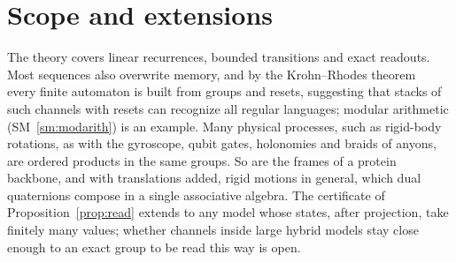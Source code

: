 \documentclass[aps,prx,reprint,superscriptaddress,longbibliography,nofootinbib,floatfix]{revtex4-2}
\theoremstyle{plain}
\theoremstyle{definition}
\begin{document}
\section{Scope and extensions}\label{sm:outlook}

The theory covers linear recurrences, bounded transitions and exact
readouts. Most sequences also overwrite memory, and by the Krohn--Rhodes
theorem~\cite{krohn_rhodes} every finite automaton is built from groups and
resets, suggesting that stacks of such channels with resets can recognize
all regular languages; modular arithmetic (SM~\ref{sm:modarith}) is an
example. Many physical processes, such as rigid-body rotations, as
with the gyroscope, qubit gates, holonomies and braids of anyons, are
ordered products in the same groups. So are the frames of a
protein backbone, and with translations added, rigid motions in general,
which dual quaternions compose in a single associative algebra. The certificate of
Proposition~\ref{prop:read} extends to any model whose states, after
projection, take finitely many values; whether channels inside large hybrid
models stay close enough to an exact group to be read this way is open.
\end{document}
